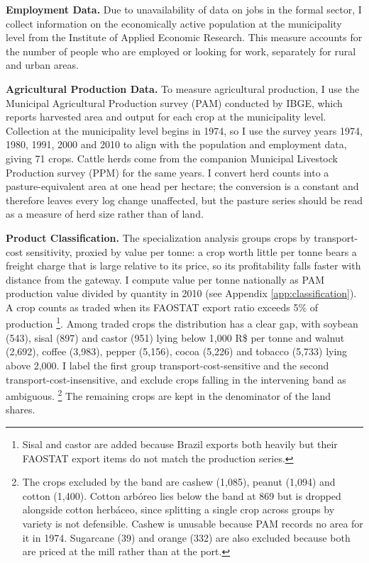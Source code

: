 \documentclass[11pt]{article}
\begin{document}
\textbf{Employment Data.} Due to unavailability of data on jobs in the formal sector, I collect information on the economically active population at the municipality level from the Institute of Applied Economic Research. This measure accounts for the number of people who are employed or looking for work, separately for rural and urban areas.

\textbf{Agricultural Production Data.} To measure agricultural production, I use the Municipal Agricultural Production survey (PAM) conducted by IBGE, which reports harvested area and output for each crop at the municipality level. Collection at the municipality level begins in 1974, so I use the survey years 1974, 1980, 1991, 2000 and 2010 to align with the population and employment data, giving 71 crops. Cattle herds come from the companion Municipal Livestock Production survey (PPM) for the same years. I convert herd counts into a pasture-equivalent area at one head per hectare; the conversion is a constant and therefore leaves every log change unaffected, but the pasture series should be read as a measure of herd size rather than of land.

\textbf{Product Classification.} The specialization analysis groups crops by transport-cost sensitivity, proxied by value per tonne: a crop worth little per tonne bears a freight charge that is large relative to its price, so its profitability falls faster with distance from the gateway. I compute value per tonne nationally as PAM production value divided by quantity in 2010 (see Appendix \ref{app:classification}). A crop counts as traded when its FAOSTAT export ratio exceeds 5\% of production \footnote{Sisal and castor are added because Brazil exports both heavily but their FAOSTAT export items do not match the production series.}. Among traded crops the distribution has a clear gap, with soybean (543), sisal (897) and castor (951) lying below 1,000 R\$ per tonne and walnut (2,692), coffee (3,983), pepper (5,156), cocoa (5,226) and tobacco (5,733) lying above 2,000. I label the first group transport-cost-sensitive and the second transport-cost-insensitive, and exclude crops falling in the intervening band as ambiguous. \footnote{The crops excluded by the band are cashew (1,085), peanut (1,094) and cotton (1,400). Cotton arbóreo lies below the band at 869 but is dropped alongside cotton herbáceo, since splitting a single crop across groups by variety is not defensible. Cashew is unusable because PAM records no area for it in 1974. Sugarcane (39) and orange (332) are also excluded because both are priced at the mill rather than at the port.} The remaining crops are kept in the denominator of the land shares.
\end{document}
